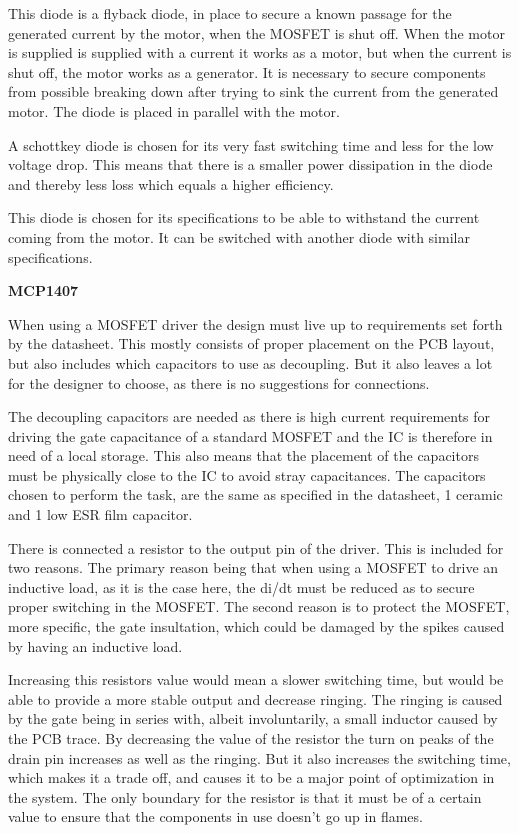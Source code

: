 This diode is a flyback diode, in place to secure a known passage for the generated current by the motor, when the MOSFET is shut off. When the motor is supplied is supplied with a current it works as a motor, but when the current is shut off, the motor works as a generator. It is necessary to secure components from possible breaking down after trying to sink the current from the generated motor. The diode is placed in parallel with the motor.

A schottkey diode is chosen for its very fast switching time and less for the low voltage drop. This means that there is a smaller power dissipation in the diode and thereby less loss which equals a higher efficiency. 

This diode is chosen for its specifications to be able to withstand the current coming from the motor. It can be switched with another diode with similar specifications.

\textbf{MCP1407} \cite{MCP1407}

When using a MOSFET driver the design must live up to requirements set forth by the datasheet. This mostly consists of proper placement on the PCB layout, but also includes which capacitors to use as decoupling. But it also leaves a lot for the designer to choose, as there is no suggestions for connections. 

The decoupling capacitors are needed as there is high current requirements for driving the gate capacitance of a standard MOSFET and the IC is therefore in need of a local storage. This also means that the placement of the capacitors must be physically close to the IC to avoid stray capacitances. The capacitors chosen to perform the task, are the same as specified in the datasheet, 1 ceramic and 1 low ESR film capacitor. 

There is connected a resistor to the output pin of the driver. This is included for two reasons. The primary reason being that when using a MOSFET to drive an inductive load, as it is the case here, the di/dt must be reduced as to secure proper switching in the MOSFET. The second reason is to protect the MOSFET, more specific, the gate insultation, which could be damaged by the spikes caused by having an inductive load.

Increasing this resistors value would mean a slower switching time, but would be able to provide a more stable output and decrease ringing. The ringing is caused by the gate being in series with, albeit involuntarily, a small inductor caused by the PCB trace. By decreasing the value of the resistor the turn on peaks of the drain pin increases as well as the ringing. But it also increases the switching time, which makes it a trade off, and causes it to be a major point of optimization in the system. The only boundary for the resistor is that it must be of a certain value to ensure that the components in use doesn't go up in flames.   

